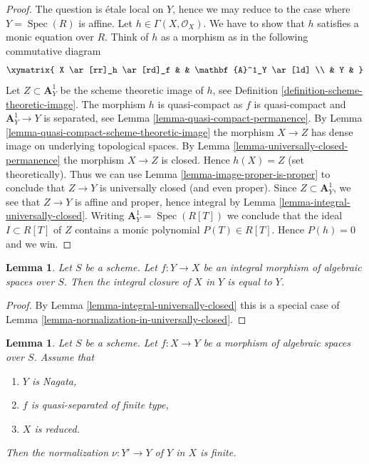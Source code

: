 \documentclass{stacks-project}
\theoremstyle{plain}
\newtheorem{lemma}[subsection]{Lemma}
\theoremstyle{definition}
\theoremstyle{remark}
\numberwithin{equation}{subsection}
\def\Spec{\mathop{\mathrm{Spec}}}
\begin{document}
\begin{proof}
The question is \'etale local on $Y$, hence we may reduce to the
case where $Y = \Spec(R)$ is affine. Let $h \in \Gamma(X, \mathcal{O}_X)$.
We have to show that $h$ satisfies a monic equation over $R$. Think of $h$
as a morphism as in the following commutative diagram
$$
\xymatrix{
X \ar[rr]_h \ar[rd]_f & & \mathbf{A}^1_Y \ar[ld] \\
& Y &
}
$$
Let $Z \subset \mathbf{A}^1_Y$ be the scheme theoretic image of $h$,
see Definition \ref{definition-scheme-theoretic-image}.
The morphism $h$ is quasi-compact as $f$ is quasi-compact and
$\mathbf{A}^1_Y \to Y$ is separated, see
Lemma \ref{lemma-quasi-compact-permanence}.
By Lemma \ref{lemma-quasi-compact-scheme-theoretic-image} the
morphism $X \to Z$ has dense image on underlying topological spaces. By
Lemma \ref{lemma-universally-closed-permanence} the morphism
$X \to Z$ is closed. Hence $h(X) = Z$ (set theoretically).
Thus we can use
Lemma \ref{lemma-image-proper-is-proper}
to conclude that $Z \to Y$ is universally closed (and even proper).
Since $Z \subset \mathbf{A}^1_Y$, we see that $Z \to Y$ is affine
and proper, hence integral by Lemma \ref{lemma-integral-universally-closed}.
Writing $\mathbf{A}^1_Y = \Spec(R[T])$ we conclude that
the ideal $I \subset R[T]$ of $Z$ contains a monic polynomial
$P(T) \in R[T]$. Hence $P(h) = 0$ and we win.
\end{proof}

\begin{lemma}
\label{lemma-normalization-in-integral}
Let $S$ be a scheme. Let $f : Y \to X$ be an integral morphism
of algebraic spaces over $S$.
Then the integral closure of $X$ in $Y$ is equal to $Y$.
\end{lemma}

\begin{proof}
By Lemma \ref{lemma-integral-universally-closed} this is a special case of
Lemma \ref{lemma-normalization-in-universally-closed}.
\end{proof}

\begin{lemma}
\label{lemma-nagata-normalization-finite}
Let $S$ be a scheme. Let $f : X \to Y$ be a morphism of algebraic spaces
over $S$. Assume that
\begin{enumerate}
\item $Y$ is Nagata,
\item $f$ is quasi-separated of finite type,
\item $X$ is reduced.
\end{enumerate}
Then the normalization $\nu : Y' \to Y$ of $Y$ in $X$ is finite.
\end{lemma}
\end{document}
